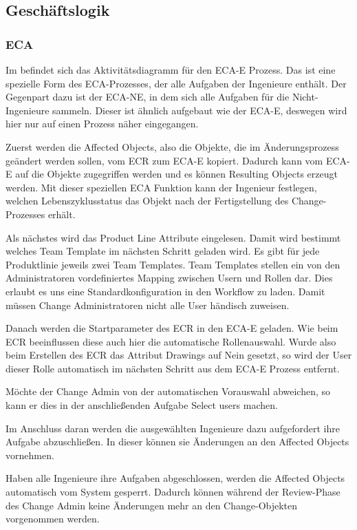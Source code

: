 \subsection{Geschäftslogik}
\label{sec:Geschaeftslogik}

\subsubsection{ECA}
Im  befindet sich das Aktivitätsdiagramm für den ECA-E Prozess.
Das ist eine spezielle Form des ECA-Prozesses, der alle Aufgaben der Ingenieure enthält.
Der Gegenpart dazu ist der ECA-NE, in dem sich alle Aufgaben für die Nicht-Ingenieure sammeln.
Dieser ist ähnlich aufgebaut wie der ECA-E, deswegen wird hier nur auf einen Prozess näher eingegangen.

Zuerst werden die \glqq Affected Objects\grqq{}, also die Objekte, die im Änderungsprozess geändert werden sollen, vom ECR zum ECA-E kopiert.
Dadurch kann vom ECA-E auf die Objekte zugegriffen werden und es können \glqq Resulting Objects\grqq{} erzeugt werden.
Mit dieser speziellen ECA Funktion kann der Ingenieur festlegen, welchen Lebenszyklusstatus das Objekt nach der Fertigstellung des Change-Prozesses erhält.

Als nächstes wird das \glqq Product Line Attribute\grqq{} eingelesen.
Damit wird bestimmt welches Team Template im nächsten Schritt geladen wird.
Es gibt für jede Produktlinie jeweils zwei Team Templates.
Team Templates stellen ein von den Administratoren vordefiniertes Mapping zwischen Usern und Rollen dar.
Dies erlaubt es uns eine Standardkonfiguration in den Workflow zu laden.
Damit müssen Change Administratoren nicht alle User händisch zuweisen.

Danach werden die Startparameter des ECR in den ECA-E geladen.
Wie beim ECR beeinflussen diese auch hier die automatische Rollenauswahl.
Wurde also \zB beim Erstellen des ECR das Attribut \glqq Drawings\grqq{} auf Nein gesetzt, so wird der User dieser Rolle automatisch im nächsten Schritt aus dem ECA-E Prozess entfernt.

Möchte der Change Admin von der automatischen Vorauswahl abweichen, so kann er dies in der anschließenden Aufgabe \glqq Select users\grqq{} machen.

Im Anschluss daran werden die ausgewählten Ingenieure dazu aufgefordert ihre Aufgabe abzuschließen.
In dieser können sie Änderungen an den Affected Objects vornehmen.

Haben alle Ingenieure ihre Aufgaben abgeschlossen, werden die Affected Objects automatisch vom System gesperrt.
Dadurch können während der Review-Phase des Change Admin keine Änderungen mehr an den Change-Objekten vorgenommen werden.

